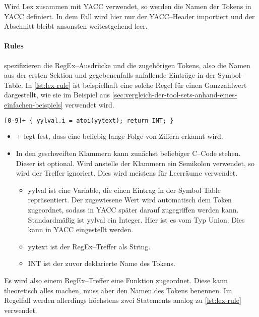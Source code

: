 Wird Lex zusammen mit \ac{YACC} verwendet, so werden die Namen der Tokens in \ac{YACC} definiert.
In dem Fall wird hier nur der \ac{YACC}--Header importiert und der Abschnitt bleibt ansonsten weitestgehend leer.

\paragraph{Rules} spezifizieren die \ac{RegEx}--Ausdrücke und die zugehörigen Tokens, also die Namen aus der ersten Sektion und gegebenenfalls anfallende Einträge in der Symbol--Table.
In \autoref{lst:lex-rule} ist beispielhaft eine solche Regel für einen Ganzzahlwert dargestellt, wie sie im Beispiel aus \autoref{sec:vergleich-der-tool-sets-anhand-eines-einfachen-beispiels} verwendet wird.
\begin{lstlisting}[label={lst:lex-rule},caption={Lex Regel},language=lex]
[0-9]+ { yylval.i = atoi(yytext); return INT; }
\end{lstlisting}
\begin{itemize}
    \item {\ttfamily [0-9]+} legt fest, dass eine beliebig lange Folge von Ziffern erkannt wird.
    \item In den geschweiften Klammern kann zunächst beliebiger C--Code stehen.
    Dieser ist optional.
    Wird anstelle der Klammern ein Semikolon verwendet, so wird der Treffer ignoriert.
    Dies wird meistens für Leerräume verwendet.
    \begin{itemize}
        \item {\ttfamily yylval} ist eine Variable, die einen Eintrag in der Symbol-Table repräsentiert.
        Der zugewiesene Wert wird automatisch dem Token zugeordnet, sodass in \ac{YACC} später darauf zugegriffen werden kann.
        Standardmäßig ist {\ttfamily yylval} ein Integer.
        Hier ist es vom Typ Union.
        Dies kann in \ac{YACC} eingestellt werden.
        \item {\ttfamily yytext} ist der \acs{RegEx}--Treffer als String.
        \item {\ttfamily INT} ist der zuvor deklarierte Name des Tokens.
    \end{itemize}
\end{itemize}

Es wird also einem \ac{RegEx}--Treffer eine Funktion zugeordnet.
Diese kann theoretisch alles machen, muss aber den Namen des Tokens benennen.
Im Regelfall werden allerdings höchstens zwei Statements analog zu \autoref{lst:lex-rule} verwendet.

